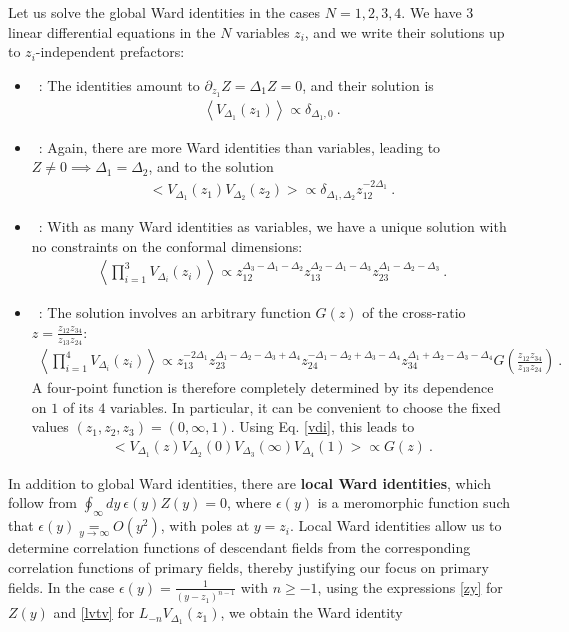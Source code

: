 \documentclass[12pt, a4paper]{article}
\theoremstyle{break}
\begin{document}
Let us solve the global Ward identities in the cases $N=1,2,3,4$. We have $3$ linear differential equations in the $N$ variables $z_i$, and we write their solutions up to $z_i$-independent prefactors:
\begin{itemize}
 \item {}\ : The identities amount to $\partial_{z_1} Z = \Delta_1 Z=0$, and their solution is 
 \begin{align}
  \left<V_{\Delta_1}(z_1)\right>\propto \delta_{\Delta_1,0}\ . 
 \end{align}
 \item {}\ : Again, there are more Ward identities than variables, leading to $Z\neq 0\implies \Delta_1=\Delta_2$, and to the solution
 \begin{align}
 \Big< V_{\Delta_1}(z_1)V_{\Delta_2}(z_2) \Big> \propto \delta_{\Delta_1,\Delta_2} z_{12}^{-2\Delta_1} \ .
 \label{2pt}
\end{align}
\item {}\ : With as many Ward identities as variables, we have a unique solution with no constraints on the conformal dimensions:
\begin{align}
 \left< \prod_{i=1}^3 V_{\Delta_i}(z_i) \right> \propto z_{12}^{\Delta_3-\Delta_1-\Delta_2} z_{13}^{\Delta_2-\Delta_1-\Delta_3} z_{23}^{\Delta_1-\Delta_2-\Delta_3}\ .
 \label{3pt}
\end{align}
\item {}\ : The solution involves an arbitrary function $G(z)$ of the cross-ratio $z=\frac{z_{12}z_{34}}{z_{13}z_{24}}$:
\begin{align}
 \left< \prod_{i=1}^4 V_{\Delta_i}(z_i) \right> 
 \propto z_{13}^{-2\Delta_1} z_{23}^{\Delta_1-\Delta_2-\Delta_3+\Delta_4} z_{24}^{-\Delta_1-\Delta_2+\Delta_3-\Delta_4} z_{34}^{\Delta_1+\Delta_2-\Delta_3-\Delta_4} G\left(\frac{z_{12}z_{34}}{z_{13}z_{24}}\right)\ .
 \label{4pt}
\end{align}
A four-point function is therefore completely determined by its dependence on $1$ of its $4$ variables. In particular, it can be convenient to choose the fixed values $(z_1,z_2,z_3)=(0,\infty,1)$. Using Eq. \eqref{vdi}, this leads to 
\begin{align}
 \Big< V_{\Delta_1}(z) V_{\Delta_2}(0)V_{\Delta_3}(\infty)V_{\Delta_4}(1) \Big> \propto G(z)\ . 
\end{align}
\end{itemize}
In addition to global Ward identities, there are \textbf{local Ward identities}, which follow from $\oint_\infty dy\ \epsilon(y)Z(y)=0$, where $\epsilon(y)$ is a meromorphic function such that $\epsilon(y)\underset{y\to\infty}{=}O(y^2)$, with poles at $y=z_i$. Local Ward identities allow us to determine correlation functions of descendant fields from the corresponding correlation functions of primary fields, thereby justifying our focus on primary fields. In the case $\epsilon(y) = \frac{1}{(y-z_1)^{n-1}}$ with $n\geq -1$, using the expressions \eqref{zy} for $Z(y)$ and \eqref{lvtv} for $L_{-n}V_{\Delta_1}(z_1)$, we obtain the Ward identity
\end{document}
